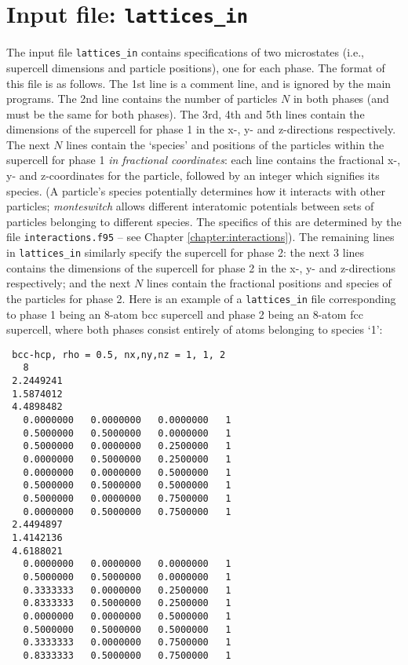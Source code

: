 \documentclass{report}
\begin{document}
\section{Input file: \texttt{lattices\_in}}\label{sec:lattices_in}
The input file \texttt{lattices\_in} contains specifications of two microstates (i.e., supercell dimensions and particle positions), one for
each phase. The format of this file is as follows. The 1st line is a comment line, and is ignored by the main programs. The 2nd line contains
the number of particles $N$ in both phases (and must be the same for both phases). The 3rd, 4th and 5th lines contain the dimensions of the
supercell for phase 1 in the x-, y- and z-directions respectively. The next $N$ lines contain the `species' and positions of the particles within 
the supercell for phase 1 \emph{in fractional coordinates}: each line contains the fractional x-, y- and z-coordinates for the particle, followed 
by an integer which signifies its species. (A particle's species potentially determines how it interacts with other particles; \emph{monteswitch} 
allows different interatomic potentials between sets of particles belonging to different species. The specifics of this are determined by the file 
\texttt{interactions.f95} -- see Chapter \ref{chapter:interactions}). The remaining lines in \texttt{lattices\_in} similarly specify the supercell 
for phase 2: the next 3 lines contains the dimensions of the supercell for phase 2 in the x-, y- and z-directions respectively; and the next $N$ 
lines contain the fractional positions and species of the particles for phase 2.
Here is an example of a \texttt{lattices\_in} file corresponding to phase 1 being an 8-atom bcc supercell and phase 2 being an 8-atom fcc supercell,
where both phases consist entirely of atoms belonging to species `1':
\begin{verbatim}
 bcc-hcp, rho = 0.5, nx,ny,nz = 1, 1, 2
   8
 2.2449241     
 1.5874012     
 4.4898482
   0.0000000   0.0000000   0.0000000   1
   0.5000000   0.5000000   0.0000000   1
   0.5000000   0.0000000   0.2500000   1
   0.0000000   0.5000000   0.2500000   1
   0.0000000   0.0000000   0.5000000   1
   0.5000000   0.5000000   0.5000000   1
   0.5000000   0.0000000   0.7500000   1
   0.0000000   0.5000000   0.7500000   1
 2.4494897     
 1.4142136     
 4.6188021     
   0.0000000   0.0000000   0.0000000   1
   0.5000000   0.5000000   0.0000000   1
   0.3333333   0.0000000   0.2500000   1
   0.8333333   0.5000000   0.2500000   1
   0.0000000   0.0000000   0.5000000   1
   0.5000000   0.5000000   0.5000000   1
   0.3333333   0.0000000   0.7500000   1
   0.8333333   0.5000000   0.7500000   1
\end{verbatim}
\end{document}
